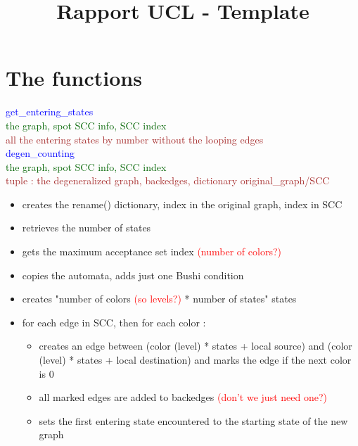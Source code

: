 \documentclass{rapport}
\title{Rapport UCL - Template} %
\begin{document}




        
\fairemarges %
\fairepagedegarde %
\tabledematieres %



\section{The functions} 

\textcolor{blue}{get_entering_states} \\
\textcolor[HTML]{006400}{the graph, spot SCC info, SCC index} \\
\textcolor{brown}{all the entering states by number without the looping edges} \\

\textcolor{blue}{degen_counting}\\
\textcolor[HTML]{006400}{the graph, spot SCC info, SCC index}\\
\textcolor{brown}{tuple : the degeneralized graph, backedges, dictionary original_graph/SCC}
\begin{itemize}
    \item creates the rename() dictionary, index in the original graph, index in SCC
    \item retrieves the number of states
    \item gets the maximum acceptance set index \textcolor{red}{(number of colors?)}
    \item copies the automata, adds just one Bushi condition
    \item creates "number of colors \textcolor{red}{(so levels?)} * number of states" states
    \item for each edge in SCC, then for each color :
    \begin{itemize}
        \item creates an edge between (color (level) * states + local source) and (color (level) * states + local destination) and marks the edge if the next color is 0 
        \item all marked edges are added to backedges \textcolor{red}{(don’t we just need one?)}
        \item sets the first entering state encountered to the starting state of the new graph
    \end{itemize}
\end{itemize}
\end{document}
